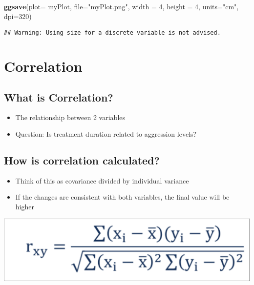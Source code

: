 \documentclass[
]{book}
\newenvironment{Shaded}{\begin{snugshade}}{\end{snugshade}}
\newcommand{\DataTypeTok}[1]{\textcolor[rgb]{0.13,0.29,0.53}{#1}}
\newcommand{\DecValTok}[1]{\textcolor[rgb]{0.00,0.00,0.81}{#1}}
\newcommand{\KeywordTok}[1]{\textcolor[rgb]{0.13,0.29,0.53}{\textbf{#1}}}
\newcommand{\NormalTok}[1]{#1}
\newcommand{\StringTok}[1]{\textcolor[rgb]{0.31,0.60,0.02}{#1}}
\providecommand{\tightlist}{%
  \setlength{\itemsep}{0pt}\setlength{\parskip}{0pt}}
\begin{document}
\begin{Shaded}
\begin{Highlighting}[]
\KeywordTok{ggsave}\NormalTok{(}\DataTypeTok{plot=}\NormalTok{ myPlot, }\DataTypeTok{file=}\StringTok{"myPlot.png"}\NormalTok{, }\DataTypeTok{width =} \DecValTok{4}\NormalTok{, }\DataTypeTok{height =} \DecValTok{4}\NormalTok{, }\DataTypeTok{units=}\StringTok{"cm"}\NormalTok{, }\DataTypeTok{dpi=}\DecValTok{320}\NormalTok{)}
\end{Highlighting}
\end{Shaded}

\begin{verbatim}
## Warning: Using size for a discrete variable is not advised.
\end{verbatim}

\hypertarget{correlation}{%
\chapter{Correlation}\label{correlation}}

\hypertarget{what-is-correlation}{%
\section{What is Correlation?}\label{what-is-correlation}}

\begin{itemize}
\tightlist
\item
  The relationship between 2 variables
\item
  Question: Is treatment duration related to aggression levels?
\end{itemize}

\hypertarget{how-is-correlation-calculated}{%
\section{How is correlation calculated?}\label{how-is-correlation-calculated}}

\begin{itemize}
\tightlist
\item
  Think of this as covariance divided by individual variance
\item
  If the changes are consistent with both variables, the final value will be higher
\end{itemize}

\begin{center}\includegraphics[width=1\linewidth]{img/correlation} \end{center}
\end{document}
